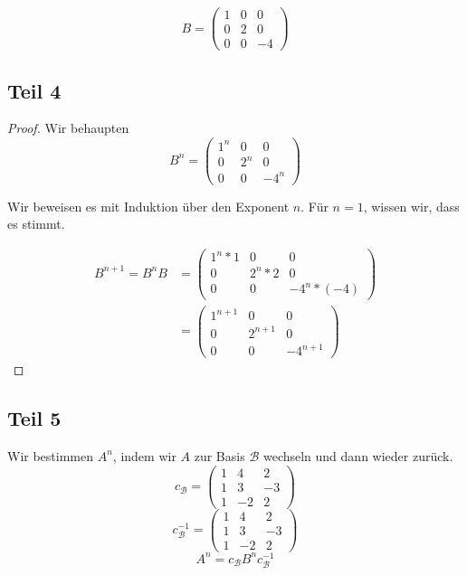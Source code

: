 \documentclass[a4paper,10pt]{article}
\begin{document}
\begin{equation}
 B =
  \begin{pmatrix}
   1 & 0 & 0\\
   0 & 2 & 0\\
   0 & 0 & -4
  \end{pmatrix}
\end{equation}

\subsection*{Teil 4}

\begin{proof}
 Wir behaupten
 \begin{equation}
  B^n = 
   \begin{pmatrix}
    1^n & 0 & 0\\
    0 & 2^n & 0\\
    0 & 0 & -4^n
   \end{pmatrix}
 \end{equation}

 Wir beweisen es mit Induktion über den Exponent $n$.
 Für $n = 1$, wissen wir, dass es stimmt.
 
 \begin{align*}
  B^{n + 1} = B^n B & = 
   \begin{pmatrix}
    1^n * 1 & 0 & 0\\
    0 & 2^n * 2 & 0\\
    0 & 0 & -4^n * (-4)
   \end{pmatrix}\\
   & = 
   \begin{pmatrix}
    1^{n + 1} & 0 & 0\\
    0 & 2^{n + 1} & 0\\
    0 & 0 & -4^{n + 1}
   \end{pmatrix}
 \end{align*}
\end{proof}

\subsection*{Teil 5}

Wir bestimmen $A^n$, indem wir $A$ zur Basis $\mathcal{B}$ wechseln und dann wieder zurück.
\begin{equation}
 c_\mathcal{B} =
  \begin{pmatrix}
   1 & 4 & 2\\
   1 & 3 & -3\\
   1 & -2 & 2
  \end{pmatrix}
\end{equation}
\begin{equation}
 c_\mathcal{B}^{-1} =
  \begin{pmatrix}
   1 & 4 & 2\\
   1 & 3 & -3\\
   1 & -2 & 2
  \end{pmatrix}
\end{equation}
\begin{equation}
 A^n = c_\mathcal{B} B^n c_\mathcal{B}^{-1}
\end{equation}
\end{document}
